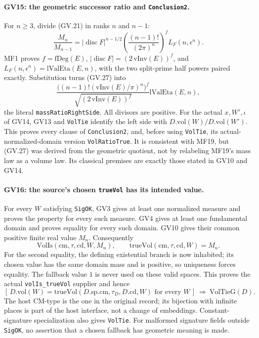 \paragraph{GV15: the geometric successor ratio and \texttt{Conclusion2}.}
For $n\ge3$, divide (GV.21) in ranks $n$ and $n-1$:
\[
 \frac{M_n}{M_{n-1}}
  =|\operatorname{disc}F|^{n-1/2}
       \left(\frac{(n-1)!}{(2\pi)^n}\right)^f
                     L_F(n,\epsilon^n).
 \tag{GV.27}
\]
MF1 proves $f=\mathrm{fDeg}(E)$,
$|\operatorname{disc}F|=(2\,\mathrm{vInv}(E))^f$, and
$L_F(n,\epsilon^n)=\mathrm{lValEta}(E,n)$, with the two split-prime
half powers paired exactly. Substitution turns (GV.27) into
\[
 \frac{\big((n-1)!(\mathrm{vInv}(E)/\pi)^n\big)^f}
            {\sqrt{(2\,\mathrm{vInv}(E))^f}}
                       \mathrm{lValEta}(E,n),         \tag{GV.28}
\]
the literal \texttt{massRatioRightSide}. All divisors are positive.
For the actual $x,W',\iota$ of GV14, GV13 and \texttt{VolTie}
identify the left side with $D.\mathrm{vol}(W)/D.\mathrm{vol}(W')$.
This proves every clause of \texttt{Conclusion2}, and, before using
\texttt{VolTie}, its actual-normalized-domain version
\texttt{VolRatioTrue}. It is consistent with MF19, but (GV.27) was
derived from the geometric quotient, not by relabeling MF19's
mass law as a volume law. Its classical premises are exactly those
stated in GV10 and GV14.

\paragraph{GV16: the source's chosen \texttt{trueVol} has its intended value.}
For every $W$ satisfying \texttt{SigOK}, GV3 gives at least one
normalized measure and proves the property for every such measure.
GV4 gives at least one fundamental domain and proves equality for
every such domain. GV10 gives their common positive finite real
value $M_n$. Consequently
\[
 \mathrm{VolIs}(\mathrm{cm},\tau,\mathrm{cd},W,M_n),\qquad
 \mathrm{trueVol}(\mathrm{cm},\tau,\mathrm{cd},W)=M_n.
 \tag{GV.29}
\]
For the second equality, the defining existential branch is now
inhabited; its chosen value has the same domain mass and is positive,
so uniqueness forces equality. The fallback value $1$ is never used
on these valid spaces. This proves the actual
\texttt{volIs\_trueVol} supplier and hence
\[
 [\,D.\mathrm{vol}(W)=\mathrm{trueVol}(D.\mathrm{sp.cm},
              \tau_D,D.\mathrm{cd},W)\text{ for every }W\,]
                 \ \Longrightarrow\ \mathrm{VolTieG}(D).
 \tag{GV.30}
\]
The host CM-type is the one in the original record; its bijection
with infinite places is part of the host interface, not a change
of embeddings. Constant-signature specialization also gives
\texttt{VolTie}. For malformed signature fields outside
\texttt{SigOK}, no assertion that a chosen fallback has geometric
meaning is made.

